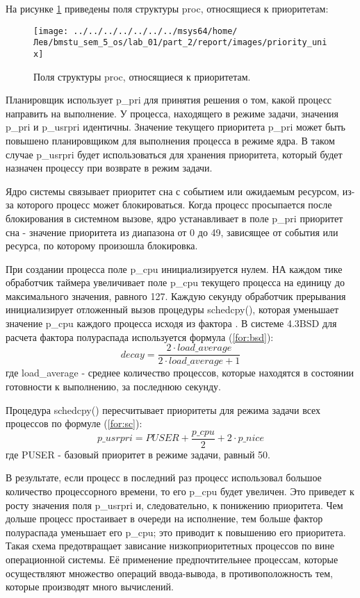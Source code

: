 На рисунке \ref{png:priority_unix} приведены поля структуры proc, относящиеся к приоритетам:
\begin{figure}[H]
	\centering
	{
		\texttt{[image: ../../../../../../../msys64/home/Лев/bmstu\_sem\_5\_os/lab\_01/part\_2/report/images/priority\_unix]}
		\caption{Поля структуры proc, относящиеся к приоритетам.}
		\label{png:priority_unix}
	}
\end{figure}

Планировщик использует p\_pri для принятия решения о том, какой процесс направить на выполнение. У процесса, находящего в режиме задачи, значения p\_pri и p\_usrpri идентичны. Значение текущего приоритета p\_pri может быть повышено планировщиком для выполнения процесса в режиме ядра. В таком случае p\_usrpri будет использоваться для хранения приоритета, который будет назначен процессу при возврате в режим задачи. 

Ядро системы связывает приоритет сна с событием или ожидаемым ресурсом, из-за которого процесс может блокироваться. Когда процесс просыпается после блокирования в системном вызове, ядро устанавливает в поле p\_pri приоритет сна - значение приоритета из диапазона от 0 до 49, зависящее от события или ресурса, по которому произошла блокировка.

При создании процесса поле p\_cpu инициализируется нулем. НА каждом тике обработчик таймера увеличивает поле p\_cpu текущего процесса на единицу до максимального значения, равного 127. Каждую секунду обработчик прерывания инициализирует отложенный вызов процедуры schedcpy(), которая уменьшает значение p\_cpu каждого процесса исходя из фактора \grqq. В системе 4.3BSD для расчета фактора полураспада используется формула (\ref{for:bsd}):
\begin{equation}
	\label{for:bsd}
	decay = \frac{2 \cdot load\_average}{2 \cdot load\_average + 1}
\end{equation}
где load\_average - среднее количество процессов, которые находятся в состоянии готовности к выполнению, за последнюю секунду.

Процедура schedcpy() пересчитывает приоритеты для режима задачи всех процессов по формуле (\ref{for:sc}):
\begin{equation}
	\label{for:sc}
	p\_usrpri = PUSER + \frac{p\_cpu}{2} + 2 \cdot p\_nice
\end{equation}
где PUSER - базовый приоритет в режиме задачи, равный 50. 

В результате, если процесс в последний раз процесс использовал большое количество процессорного времени, то его p\_cpu будет увеличен. Это приведет к росту значения поля p\_usrpri и, следовательно, к понижению приоритета. Чем дольше процесс простаивает в очереди на исполнение, тем больше фактор полураспада уменьшает его p\_cpu; это приводит к повышению его приоритета. Такая схема предотвращает зависание низкоприоритетных процессов по вине операционной системы. Её применение предпочтительнее процессам, которые осуществляют множество операций ввода-вывода, в противоположность тем, которые производят много вычислений.